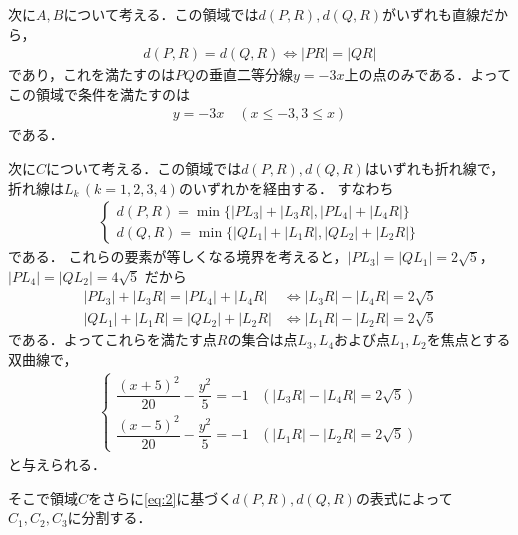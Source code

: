 \documentclass[../../main.tex]{subfiles}
\begin{document}
次に$A,B$について考える．この領域では$d(P,R),d(Q,R)$がいずれも直線だから，
\begin{align}
  d(P,R)=d(Q,R) \iff |PR| = |QR|
\end{align}
であり，これを満たすのは$PQ$の垂直二等分線$y=-3x$上の点のみである．よってこの領域で条件を満たすのは
\begin{align}
  y = -3x \quad (x\le -3,3 \le x) \label{eq:1}
\end{align}
である．

次に$C$について考える．この領域では$d(P,R),d(Q,R)$はいずれも折れ線で，折れ線は$L_k\,(k=1,2,3,4)$のいずれかを経由する．
すなわち
\begin{align}
  \begin{cases}
    d(P,R) = \min \{ |PL_3| + |L_3R|, |PL_4| + |L_4R| \} \\
    d(Q,R) = \min \{ |QL_1| + |L_1R|, |QL_2| + |L_2R| \}
  \end{cases} \label{eq:2}
\end{align}
である．
これらの要素が等しくなる境界を考えると，$|PL_3| = |QL_1| = 2\sqrt{5}$， $|PL_4| = |QL_2| = 4\sqrt{5}$ だから
\begin{align}
  |PL_3| + |L_3R| = |PL_4| + |L_4R| &\iff |L_3R| - |L_4R| = 2\sqrt{5} \label{eq:3} \\
  |QL_1| + |L_1R| = |QL_2| + |L_2R| &\iff |L_1R| - |L_2R| = 2\sqrt{5} \label{eq:4}
\end{align}
である．よってこれらを満たす点$R$の集合は点$L_3,L_4$および点$L_1,L_2$を焦点とする双曲線で，
\begin{align}
  \begin{cases}
    \dfrac{(x+5)^2}{20} - \dfrac{y^2}{5} = -1 & (|L_3R| - |L_4R| = 2\sqrt{5}) \\
    \dfrac{(x-5)^2}{20} - \dfrac{y^2}{5} = -1 & (|L_1R| - |L_2R| = 2\sqrt{5})
  \end{cases} \label{eq:5}
\end{align}
と与えられる．

そこで領域$C$をさらに\cref{eq:2}に基づく$d(P,R),d(Q,R)$の表式によって$C_1,C_2,C_3$に分割する．
\end{document}
